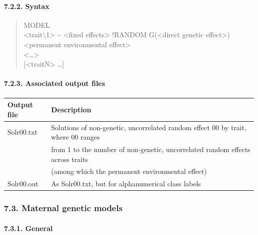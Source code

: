 \paragraph{7.2.2. Syntax}\label{Stat08}

\begin{quote}
MODEL\\
\textless trait\textbackslash1\textgreater{} \textasciitilde{}
\textless fixed effects\textgreater{} !RANDOM G(\textless direct genetic
effect\textgreater) \textless permanent environmental
effect\textgreater{}\\
\textless\ldots\textgreater{}\\
{[}\textless traitN\textgreater{} \ldots{]}
\end{quote}

\paragraph{7.2.3. Associated output files}\label{Stat09}

{\def\LTcaptype{none} %
\begin{longtable}[]{@{}
  >{\raggedright\arraybackslash}p{}
  >{\raggedright\arraybackslash}p{}@{}}
\toprule\noalign{}
\begin{minipage}[b]{\linewidth}\raggedright
Output file
\end{minipage} & \begin{minipage}[b]{\linewidth}\raggedright
Description
\end{minipage} \\
\midrule\noalign{}
\endhead
\bottomrule\noalign{}
\endlastfoot
Solr00.txt & Solutions of non-genetic, uncorrelated random effect 00 by
trait, where 00 ranges \\
& from 1 to the number of non-genetic, uncorrelated random effects
across traits \\
& (among which the permanent environmental effect) \\
Solr00.out & As Solr00.txt, but for alphanumerical class labels \\
\end{longtable}
}

\subsubsection{7.3. Maternal genetic models}\label{Stat10}

\paragraph{7.3.1. General}\label{Stat11}

